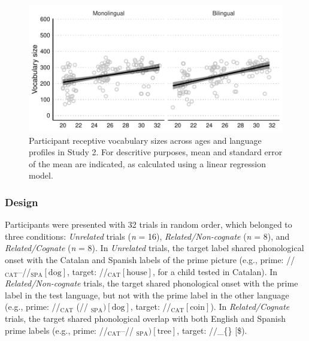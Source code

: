 \documentclass[
  12pt,
  b5paperpaper,
  twoside]{scrreprt}
\begin{document}
\begin{figure}

{\centering \includegraphics{chapters/03-chapter-3_files/figure-pdf/fig-vocabulary-bcn-1.pdf}

}

\caption{\label{fig-vocabulary-bcn}Participant receptive vocabulary
sizes across ages and language profiles in Study 2. For descritive
purposes, mean and standard error of the mean are indicated, as
calculated using a linear regression model.}

\end{figure}

\hypertarget{design-1}{%
\subsubsection{Design}\label{design-1}}

Participants were presented with 32 trials in random order, which
belonged to three conditions: \emph{Unrelated} trials (\emph{n} = 16),
\emph{Related/Non-cognate} (\emph{n} = 8), and \emph{Related/Cognate}
(\emph{n} = 8). In \emph{Unrelated} trials, the target label shared
phonological onset with the Catalan and Spanish labels of the prime
picture (e.g., prime:
//\(_{\text{CAT}}\)--//\(_{\text{SPA}} [\text{dog}]\),
target: //\(_{\text{CAT}} [\text{house}]\), for a child
tested in Catalan). In \emph{Related/Non-cognate} trials, the target
shared phonological onset with the prime label in the test language, but
not with the prime label in the other language (e.g., prime:
/\textbf{}\textdyoghlig{}/\(_{\text{CAT}}\)
(// \(_{\text{SPA}}) [\text{dog}]\), target:
/\textbf{}/\(_{\text{CAT}} [\text{coin}]\)).
In \emph{Related/Cognate} trials, the target shared phonological overlap
with both English and Spanish prime labels (e.g., prime:
/\textbf{}/\(_{\text{CAT}}\)--/\textbf{}/
\(_{\text{SPA}}) [\text{tree}]\), target:
/\textbf{}\(/\)\_\{\}
{[}\text{bee}{]}\$).
\end{document}
